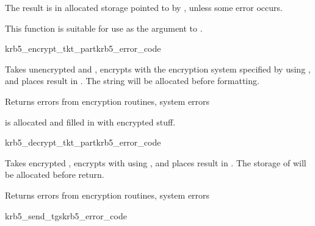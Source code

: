 The result is in allocated storage pointed to by
, unless some error occurs.

This function is suitable for use as the 
argument to .

\begin{funcdecl}{krb5_encrypt_tkt_part}{krb5_error_code}{ \funcin}
\funcinout
{}
\end{funcdecl}

\internalfunc

Takes unencrypted  and
, encrypts with
the encryption system specified by  using
, and places result in 
.
The string  will be allocated
before formatting.

Returns errors from encryption routines, system errors

 is allocated and filled in with
encrypted stuff.

\begin{funcdecl}{krb5_decrypt_tkt_part}{krb5_error_code}{\funcin}
\funcinout
{}
\end{funcdecl}

\internalfunc

Takes encrypted , encrypts with
using , and places result in
.  The storage of
 will be allocated before return.

Returns errors from encryption routines, system errors

\begin{funcdecl}{krb5_send_tgs}{krb5_error_code}{\funcin}
\funcinout
{}
\funcout
{}
\end{funcdecl}

